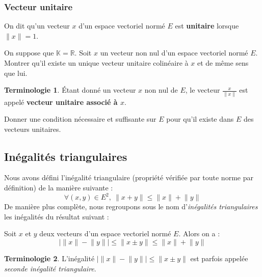\documentclass[french]{article}
\newcommand{\R}{\mathbb{R}}
\newcommand{\K}{\mathbb{K}}
\theoremstyle{plain}
\theoremstyle{definition}
\newtheorem*{terminologie}{Terminologie}
\theoremstyle{remark}
\begin{document}
\subsubsection*{Vecteur unitaire}

\begin{dfn}
	On dit qu'un vecteur $x$ d'un espace vectoriel normé $E$ est \textbf{unitaire} lorsque $\lVert x\rVert=1$.
\end{dfn}

\begin{exo}[$\circ$]
	On suppose que $\K=\R$. Soit $x$ un vecteur non nul d'un espace vectoriel normé $E$. Montrer qu'il existe un unique vecteur unitaire colinéaire à $x$ et de même sens que lui.
\end{exo}

\begin{terminologie}
	Étant donné un vecteur $x$ non nul de $E$, le vecteur $\displaystyle\frac{x}{\lVert x\rVert}$ est appelé \textbf{vecteur unitaire associé à $x$}.
\end{terminologie}

\begin{exo}[$\circ$]
	Donner une condition nécessaire et suffisante sur $E$ pour qu'il existe dans $E$ des vecteurs unitaires.
\end{exo}


\subsection{Inégalités triangulaires}

Nous avons défini l'inégalité triangulaire (propriété vérifiée par toute norme par définition) de la manière suivante : $$\forall (x,y)\in E^2,\ \lVert x+y\rVert\leqslant\lVert x\rVert+\lVert y\rVert$$ De manière plus complète, nous regroupons sous le nom d'\textit{inégalités triangulaires} les inégalités du résultat suivant :

\begin{prop}%
	Soit $x$ et $y$ deux vecteurs d'un espace vectoriel normé $E$. Alors on a : $$\lvert \lVert x\rVert-\lVert y\rVert\rvert\leqslant\lVert x\pm y\rVert\leqslant\lVert x\rVert+\lVert y\rVert$$
\end{prop}

\begin{terminologie}
	L'inégalité $\lvert \lVert x\rVert-\lVert y\rVert\rvert\leqslant\lVert x\pm y\rVert$ est parfois appelée \textit{seconde inégalité triangulaire}.
\end{terminologie}
\end{document}
